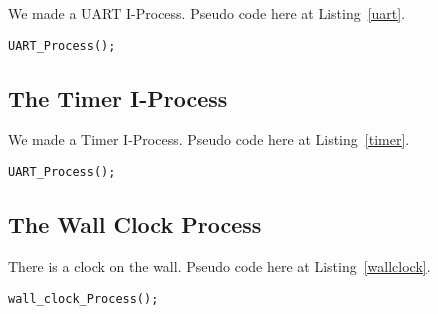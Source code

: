 \documentclass[oneside]{article}
\begin{document}
We made a UART I-Process. Pseudo code here at Listing~\ref{uart}.

\begin{lstlisting}
UART_Process();
\end{lstlisting}

\subsection*{The Timer I-Process}

We made a Timer I-Process. Pseudo code here at Listing~\ref{timer}.

\begin{lstlisting}
UART_Process();
\end{lstlisting}

\subsection*{The Wall Clock Process}

There is a clock on the wall. Pseudo code here at Listing~\ref{wallclock}.

\begin{lstlisting}
wall_clock_Process();
\end{lstlisting}
\end{document}
